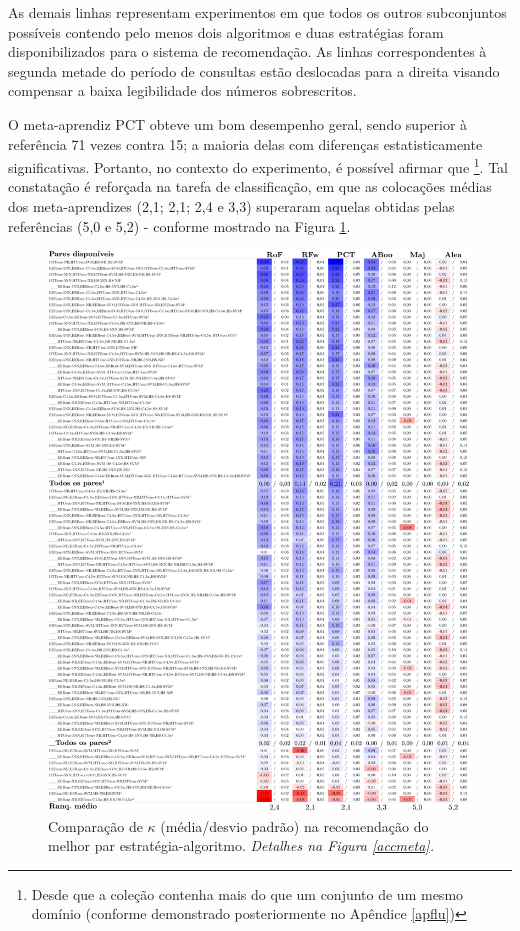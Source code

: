 As demais linhas representam experimentos em que todos os outros subconjuntos possíveis contendo pelo menos dois algoritmos e duas estratégias foram disponibilizados para o sistema de recomendação.
As linhas correspondentes à segunda metade do período de consultas estão deslocadas para a direita visando compensar a baixa legibilidade dos números sobrescritos.

O meta-aprendiz PCT obteve um bom desempenho geral, sendo superior à referência 71 vezes contra 15; a maioria delas com diferenças estatisticamente significativas.
Portanto, no contexto do experimento, é possível afirmar que \footnote{Desde que a coleção contenha mais do que um conjunto de um mesmo domínio (conforme demonstrado posteriormente no Apêndice \ref{apflu})}.
Tal constatação é reforçada na tarefa de classificação, em que as colocações médias dos meta-aprendizes (2,1; 2,1; 2,4 e 3,3) superaram aquelas obtidas pelas referências (5,0 e 5,2) - conforme mostrado na Figura \ref{par}.
\begin{figure}
\centering
\includegraphics[scale=0.195]{images/metapar.pdf}
\caption[Comparação de $\kappa$ na recomendação do melhor par estratégia-algoritmo.]{Comparação de $\kappa$ (média/desvio padrão) na recomendação do melhor par estratégia-algoritmo.
\textit{Detalhes na Figura \ref{accmeta}.}}
\label{par}
\end{figure}
